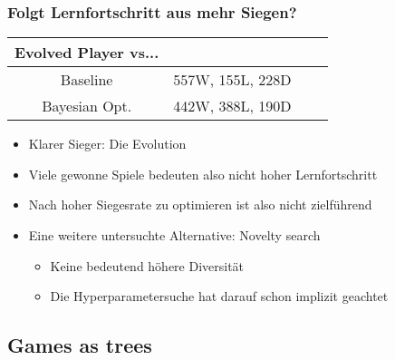 \begin{frame}
 \frametitle{Folgt Lernfortschritt aus mehr Siegen?}
  


\pause
\begin{table} [H]
 \centering

  \begin{tabular}{ c c c c }
  \\
	Evolved Player vs...       &   \\
  \hline
  Baseline & 557W, 155L, 228D \\
  Bayesian Opt. & 442W, 388L, 190D  \\
  \end{tabular}

\end{table}

\begin{itemize}
  \item \pause Klarer Sieger: Die Evolution
  \item \pause Viele gewonne Spiele bedeuten also nicht hoher Lernfortschritt
  \item \pause Nach hoher Siegesrate zu optimieren ist also nicht zielführend
  \item \pause Eine weitere untersuchte Alternative: Novelty search
\begin{itemize}
  \item \pause Keine bedeutend höhere Diversität
  \item \pause Die Hyperparametersuche hat darauf schon implizit geachtet
\end{itemize}
\end{itemize}

  
\end{frame}

\subsection{Games as trees}



